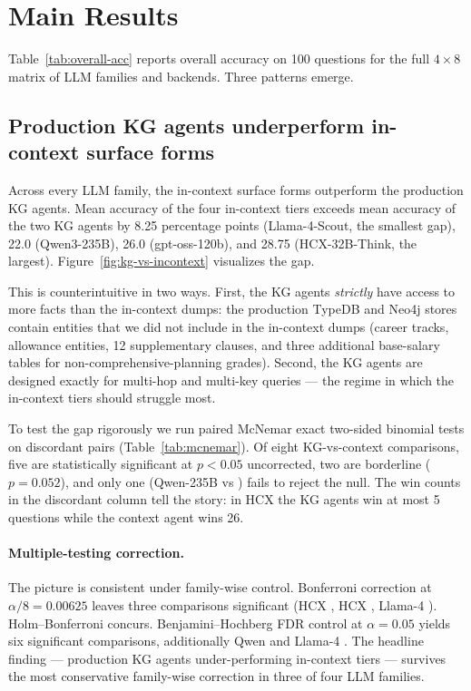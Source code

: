 \section{Main Results}\label{sec:results}



Table~\ref{tab:overall-acc} reports overall accuracy on 100 questions
for the full $4\times 8$ matrix of LLM families and backends. Three
patterns emerge.

\subsection{Production KG agents underperform in-context surface forms}

Across every LLM family, the in-context surface forms outperform the
production KG agents. Mean accuracy of the four in-context tiers
exceeds mean accuracy of the two KG agents by 8.25 percentage points
(Llama-4-Scout, the smallest gap), 22.0 (Qwen3-235B), 26.0
(gpt-oss-120b), and 28.75 (HCX-32B-Think, the largest).
Figure~\ref{fig:kg-vs-incontext} visualizes the gap.



This is counterintuitive in two ways. First, the KG agents
\emph{strictly} have access to more facts than the in-context dumps:
the production TypeDB and Neo4j stores contain entities that we did
not include in the in-context dumps (career tracks, allowance entities,
12 supplementary clauses, and three additional base-salary tables for
non-comprehensive-planning grades). Second, the KG agents are designed
exactly for multi-hop and multi-key queries — the regime in which the
in-context tiers should struggle most.

To test the gap rigorously we run paired McNemar exact two-sided
binomial tests on discordant pairs (Table~\ref{tab:mcnemar}). Of eight
KG-vs-context comparisons, five are statistically significant at
$p<0.05$ uncorrected, two are borderline ($p=0.052$), and only one
(Qwen-235B  vs ) fails to
reject the null. The win counts in the discordant column tell the
story: in HCX the KG agents win at most 5 questions while the context
agent wins 26.



\paragraph{Multiple-testing correction.}
The picture is consistent under family-wise control. Bonferroni
correction at $\alpha/8 = 0.00625$ leaves three comparisons significant
(HCX , HCX , Llama-4
). Holm--Bonferroni concurs. Benjamini--Hochberg
FDR control at $\alpha=0.05$ yields six significant comparisons,
additionally Qwen  and Llama-4 .
The headline finding — production KG agents under-performing
in-context tiers — survives the most conservative family-wise
correction in three of four LLM families.

